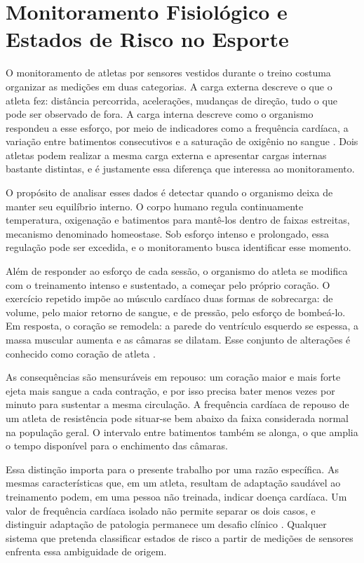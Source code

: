 \section{Monitoramento Fisiológico e Estados de Risco no Esporte}
O monitoramento de atletas por sensores vestidos durante o treino costuma organizar as medições em duas categorias. A carga externa descreve o que o atleta fez: distância percorrida, acelerações, mudanças de direção, tudo o que pode ser observado de fora. A carga interna descreve como o organismo respondeu a esse esforço, por meio de indicadores como a frequência cardíaca, a variação entre batimentos consecutivos e a saturação de oxigênio no sangue \cite{seshadri2019, estrella2025}. Dois atletas podem realizar a mesma carga externa e apresentar cargas internas bastante distintas, e é justamente essa diferença que interessa ao monitoramento.

O propósito de analisar esses dados é detectar quando o organismo deixa de manter seu equilíbrio interno. O corpo humano regula continuamente temperatura, oxigenação e batimentos para mantê-los dentro de faixas estreitas, mecanismo denominado homeostase. Sob esforço intenso e prolongado, essa regulação pode ser excedida, e o monitoramento busca identificar esse momento.

Além de responder ao esforço de cada sessão, o organismo do atleta se modifica com o treinamento intenso e sustentado, a começar pelo próprio coração. O exercício repetido impõe ao músculo cardíaco duas formas de sobrecarga: de volume, pelo maior retorno de sangue, e de pressão, pelo esforço de bombeá-lo. Em resposta, o coração se remodela: a parede do ventrículo esquerdo se espessa, a massa muscular aumenta e as câmaras se dilatam. Esse conjunto de alterações é conhecido como coração de atleta \cite{mckelvie2024coracao}.

As consequências são mensuráveis em repouso: um coração maior e mais forte ejeta mais sangue a cada contração, e por isso precisa bater menos vezes por minuto para sustentar a mesma circulação. A frequência cardíaca de repouso de um atleta de resistência pode situar-se bem abaixo da faixa considerada normal na população geral. O intervalo entre batimentos também se alonga, o que amplia o tempo disponível para o enchimento das câmaras.

Essa distinção importa para o presente trabalho por uma razão específica. As mesmas características que, em um atleta, resultam de adaptação saudável ao treinamento podem, em uma pessoa não treinada, indicar doença cardíaca. Um valor de frequência cardíaca isolado não permite separar os dois casos, e distinguir adaptação de patologia permanece um desafio clínico \cite{bellfield2022}. Qualquer sistema que pretenda classificar estados de risco a partir de medições de sensores enfrenta essa ambiguidade de origem.

